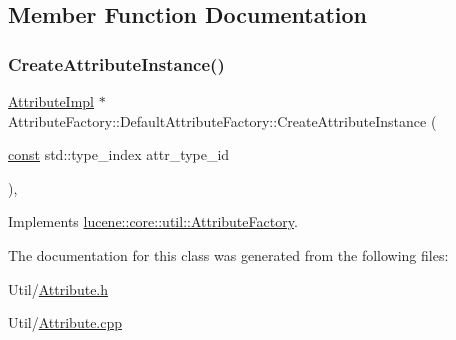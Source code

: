 \subsection{Member Function Documentation}
\mbox{\label{classlucene_1_1core_1_1util_1_1AttributeFactory_1_1DefaultAttributeFactory_af9b68def67fc7995d2c5e9f3d1560f5e}} 
\subsubsection{\texorpdfstring{Create\+Attribute\+Instance()}{CreateAttributeInstance()}}
{\footnotesize\ttfamily \mbox{\hyperlink{classlucene_1_1core_1_1util_1_1AttributeImpl}{Attribute\+Impl}} $\ast$ Attribute\+Factory\+::\+Default\+Attribute\+Factory\+::\+Create\+Attribute\+Instance (\begin{DoxyParamCaption}\item[{\mbox{\hyperlink{ZlibCrc32_8h_a2c212835823e3c54a8ab6d95c652660e}{const}} std\+::type\+\_\+index}]{attr\+\_\+type\+\_\+id }\end{DoxyParamCaption})\hspace{0.3cm}{\ttfamily [override]}, {\ttfamily [virtual]}}



Implements \mbox{\hyperlink{classlucene_1_1core_1_1util_1_1AttributeFactory_a88ccb9965ed78099379eaf9b1256abf3}{lucene\+::core\+::util\+::\+Attribute\+Factory}}.



The documentation for this class was generated from the following files\+:\begin{DoxyCompactItemize}
\item 
Util/\mbox{\hyperlink{Util_2Attribute_8h}{Attribute.\+h}}\item 
Util/\mbox{\hyperlink{Util_2Attribute_8cpp}{Attribute.\+cpp}}\end{DoxyCompactItemize}
